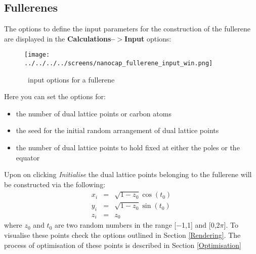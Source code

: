 \subsection{Fullerenes}





The options to define the input parameters for the construction of the fullerene are displayed in the \textbf{Calculations--$>$Input} options:

 \begin{figure}[h!]
\centering
\texttt{[image: ../../../../screens/nanocap\_fullerene\_input\_win.png]}
\caption{\nanocap~input options for a fullerene}
\label{fullerene_input_options}
\end{figure}

Here you can set the options for:
\begin{itemize}
 \item the number of dual lattice points or carbon atoms
 \item the seed for the initial random arrangement of dual lattice points
 \item the number of dual lattice points to hold fixed at either the poles or the equator
 \end{itemize}
 
Upon on clicking \textit{Initialise} the dual lattice points belonging to the fullerene will be constructed via the following:
\begin{equation}
\begin{array}{lcl}
x_i & = & \sqrt{1 - z_0}\cos(t_0) \\
y_i & = & \sqrt{1 - z_0}\sin(t_0) \\
z_i & = & z_0
\end{array}
\label{randomspheregen}
\end{equation}
where  $z_0$ and  $t_0$ are two random numbers in the range [$-$1,1] and [0,2$\pi$]. To visualise these points check the options outlined in Section \ref{Rendering}. The process of optimisation of these points is described in Section \ref{Optimisation}
